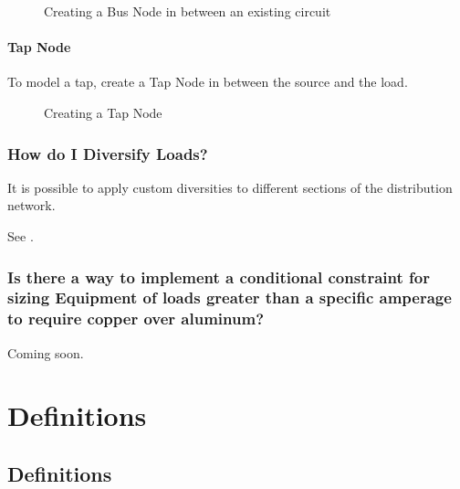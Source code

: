 \documentclass[letterpaper,10pt,english]{sphinxmanual}
\begin{document}
\begin{figure}[H]
\centering
\capstart

\noindent{}
\caption{Creating a Bus Node in between an existing circuit}\label{\detokenize{docs/faq:id8}}\end{figure}


\subsubsection{Tap Node}
\label{\detokenize{docs/faq:tap-node}}\label{\detokenize{docs/faq:id2}}
To model a tap, create a Tap Node in between the source and the load.

\begin{figure}[H]
\centering
\capstart

\noindent{}
\caption{Creating a Tap Node}\label{\detokenize{docs/faq:id9}}\end{figure}


\subsection{How do I Diversify Loads?}
\label{\detokenize{docs/faq:how-do-i-diversify-loads}}
It is possible to apply custom diversities to different sections of the distribution network.

See {\hyperref[\detokenize{docs/userguide/definingarchitecturalelements/archelements/index-arch-elements:diversification}]{}}.


\subsection{Is there a way to implement a conditional constraint for sizing Equipment of loads greater than a specific amperage to require copper over aluminum?}
\label{\detokenize{docs/faq:is-there-a-way-to-implement-a-conditional-constraint-for-sizing-equipment-of-loads-greater-than-a-specific-amperage-to-require-copper-over-aluminum}}
Coming soon.


\chapter{Definitions}
\label{\detokenize{docs/index:definitions}}

\section{Definitions}
\label{\detokenize{docs/definitions/index-definitions:definitions}}\label{\detokenize{docs/definitions/index-definitions:id1}}\label{\detokenize{docs/definitions/index-definitions::doc}}
\end{document}
